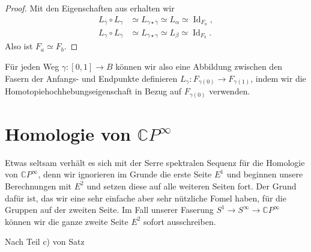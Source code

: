 \documentclass[12pt, hidelinks]{article}
\numberwithin{conj}{section}
\begin{document}
\begin{proof}
Mit den Eigenschaften aus \cite[Prop. 4.61]{hatcher2001} erhalten wir
\begin{align}
L_{\overline{\gamma}} \circ L_\gamma &\simeq L_{\gamma \star \overline{\gamma}} \simeq L_\alpha \simeq \operatorname{Id}_{F_a}, \\
L_{\gamma} \circ L_{\overline{\gamma}} &\simeq L_{\overline{\gamma} \star \gamma} \simeq L_\beta \simeq \operatorname{Id}_{F_b}.
\end{align}
Also ist $F_a \simeq F_b$.
\end{proof}

Für jeden Weg $\gamma: [0,1] \to B$ können wir also eine Abbildung zwischen den Fasern der Anfangs- und Endpunkte definieren $L_\gamma: F_{\gamma(0)} \to F_{\gamma(1)}$, indem wir die Homotopiehochhebungseigenschaft in Bezug auf $F_{\gamma(0)}$ verwenden. 

\section{Homologie von $\mathbb{C}P^\infty$}


Etwas seltsam verhält es sich mit der Serre spektralen Sequenz für die Homologie von $\mathbb{C}P^\infty$, denn wir ignorieren im Grunde die erste Seite $E^1$ und beginnen unsere Berechnungen mit $E^2$ und setzen diese auf alle weiteren Seiten fort. Der Grund dafür ist, das wir eine sehr einfache aber sehr nützliche Fomel haben, für die Gruppen auf der zweiten Seite. Im Fall unserer Faserung $S^1 \to S^\infty \to \mathbb{C}P^\infty$ können wir die ganze zweite Seite $E^2$ sofort ausschreiben.

Nach Teil c) von Satz 
\nocite{*}
\printbibliography
\end{document}
